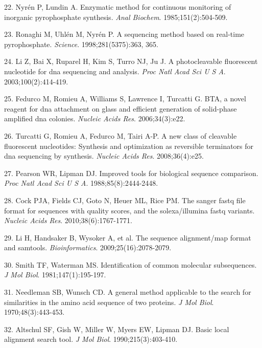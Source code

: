 \documentclass[11pt,letterpaper]{book}
\begin{document}
\leavevmode\hypertarget{ref-nyren:1985aa}{}%
22. Nyrén P, Lundin A. Enzymatic method for continuous monitoring of inorganic pyrophosphate synthesis. \emph{Anal Biochem}. 1985;151(2):504-509.

\leavevmode\hypertarget{ref-ronaghi:1998aa}{}%
23. Ronaghi M, Uhlén M, Nyrén P. A sequencing method based on real-time pyrophosphate. \emph{Science}. 1998;281(5375):363, 365.

\leavevmode\hypertarget{ref-li:2003aa}{}%
24. Li Z, Bai X, Ruparel H, Kim S, Turro NJ, Ju J. A photocleavable fluorescent nucleotide for dna sequencing and analysis. \emph{Proc Natl Acad Sci U S A}. 2003;100(2):414-419.

\leavevmode\hypertarget{ref-fedurco:2006aa}{}%
25. Fedurco M, Romieu A, Williams S, Lawrence I, Turcatti G. BTA, a novel reagent for dna attachment on glass and efficient generation of solid-phase amplified dna colonies. \emph{Nucleic Acids Res}. 2006;34(3):e22.

\leavevmode\hypertarget{ref-turcatti:2008aa}{}%
26. Turcatti G, Romieu A, Fedurco M, Tairi A-P. A new class of cleavable fluorescent nucleotides: Synthesis and optimization as reversible terminators for dna sequencing by synthesis. \emph{Nucleic Acids Res}. 2008;36(4):e25.

\leavevmode\hypertarget{ref-pearson:1988aa}{}%
27. Pearson WR, Lipman DJ. Improved tools for biological sequence comparison. \emph{Proc Natl Acad Sci U S A}. 1988;85(8):2444-2448.

\leavevmode\hypertarget{ref-cock:2010aa}{}%
28. Cock PJA, Fields CJ, Goto N, Heuer ML, Rice PM. The sanger fastq file format for sequences with quality scores, and the solexa/illumina fastq variants. \emph{Nucleic Acids Res}. 2010;38(6):1767-1771.

\leavevmode\hypertarget{ref-li:2009aa}{}%
29. Li H, Handsaker B, Wysoker A, et al. The sequence alignment/map format and samtools. \emph{Bioinformatics}. 2009;25(16):2078-2079.

\leavevmode\hypertarget{ref-smith:1981aa}{}%
30. Smith TF, Waterman MS. Identification of common molecular subsequences. \emph{J Mol Biol}. 1981;147(1):195-197.

\leavevmode\hypertarget{ref-needleman:1970aa}{}%
31. Needleman SB, Wunsch CD. A general method applicable to the search for similarities in the amino acid sequence of two proteins. \emph{J Mol Biol}. 1970;48(3):443-453.

\leavevmode\hypertarget{ref-altschul:1990aa}{}%
32. Altschul SF, Gish W, Miller W, Myers EW, Lipman DJ. Basic local alignment search tool. \emph{J Mol Biol}. 1990;215(3):403-410.
\end{document}
